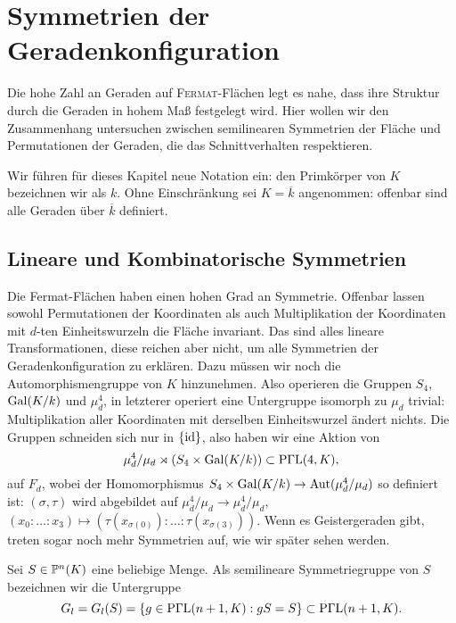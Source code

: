 \chapter{Symmetrien der Geradenkonfiguration} \label{chap:configsymm}
Die hohe Zahl an Geraden auf \textsc{Fermat}-Flächen legt es nahe, dass ihre Struktur durch die Geraden in hohem Maß festgelegt wird. Hier wollen wir den Zusammenhang untersuchen zwischen semilinearen Symmetrien der Fläche und Permutationen der Geraden, die das Schnittverhalten respektieren.

Wir führen für dieses Kapitel neue Notation ein: den Primkörper von $K$ bezeichnen wir als $k$. Ohne Einschränkung sei $K = \overline k$ angenommen: offenbar sind alle Geraden über $\overline k$ definiert.

\section{Lineare und Kombinatorische Symmetrien}
Die Fermat-Flächen haben einen hohen Grad an Symmetrie. Offenbar lassen sowohl Permutationen der Koordinaten als auch Multiplikation der Koordinaten mit $d$-ten Einheitswurzeln die Fläche invariant. Das sind alles lineare Transformationen, diese reichen aber nicht, um alle Symmetrien der Geradenkonfiguration zu erklären. Dazu müssen wir noch die Automorphismengruppe von $K$ hinzunehmen. Also operieren die Gruppen $S_4$, $\Gal K/k$ und $\mu_d^4$, in letzterer operiert eine Untergruppe isomorph zu $\mu_d$ trivial: Multiplikation aller Koordinaten mit derselben Einheitswurzel ändert nichts. Die Gruppen schneiden sich nur in $\{\operatorname{id}\}$, also haben wir eine Aktion von
\begin{equation}
\mu_d^4 / \mu_d \rtimes (S_4 \times \Gal K/k) \subset \PGaL 4K,
\end{equation}
auf $F_d$, wobei der Homomorphismus $S_4 \times \Gal K/k \rightarrow \Aut(\mu_d^4 / \mu_d)$ so definiert ist: $(\sigma, \tau)$ wird abgebildet auf $\mu_d^4 / \mu_d \to \mu_d^4 / \mu_d$, $(x_0:\dots:x_3) \mapsto (\tau(x_{\sigma(0)}):\dots:\tau(x_{\sigma(3)}))$. Wenn es Geistergeraden gibt, treten sogar noch mehr Symmetrien auf, wie wir später sehen werden.

\begin{defin}
Sei $S \in \mathbb P^{n}(K)$ eine beliebige Menge. Als semilineare Symmetriegruppe von $S$ bezeichnen wir die Untergruppe
\begin{equation}
G_l = G_l(S) = \{ g \in \mathrm{P\Gamma L}(n+1,K): gS = S \} \subset \mathrm{P\Gamma L}(n+1,K).
\end{equation}
\end{defin}

